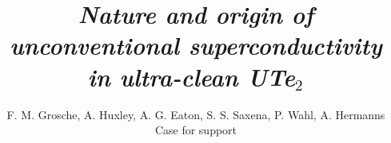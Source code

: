 \documentclass[twocolumn,prl,a4paper,tightenlines,10pt]{revtex4-2}
\begin{document}



\newcommand{\Figures}{/Users/fmg12/Documents/data/Figures}


\title {\textit{Nature and origin of unconventional superconductivity in ultra-clean UTe$_2$}} %

\author {F. M. Grosche, A. Huxley, A. G. Eaton, S. S. Saxena, P. Wahl, A. Hermanns
\\ \vspace{0.2cm}
Case for support}

\begin{abstract}
\vspace{-0.8cm} 
\noindent 

\end{abstract}
\setlength{\columnsep}{2em}
\fontsize{10.9pt}{12.1pt}\selectfont
\maketitle
%

\setlength{\columnsep}{2em}

\vspace{-0.5em}


\clearpage
%
%

\end{document}
